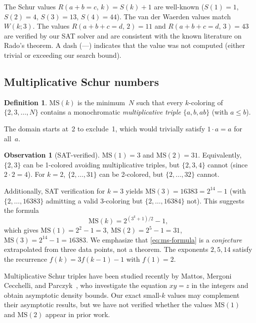 \documentclass[11pt]{article}
\theoremstyle{plain}
\theoremstyle{definition}
\newtheorem{definition}[theorem]{Definition}
\newtheorem{observation}[theorem]{Observation}
\newcommand{\MS}{\mathrm{MS}}
\begin{document}
\noindent
The Schur values $R(a{+}b{=}c,\, k) = S(k)+1$ are well-known
($S(1)=1$, $S(2)=4$, $S(3)=13$, $S(4)=44$).
The van der Waerden values match $W(k;3)$.
The values $R(a{+}b{+}c{=}d,\, 2)=11$ and
$R(a{+}b{+}c{=}d,\, 3)=43$ are verified by our SAT solver and are
consistent with the known literature on Rado's theorem.
A dash (---) indicates that the value was not computed (either
trivial or exceeding our search bound).

\subsection{Multiplicative Schur numbers}

\begin{definition}
$\MS(k)$ is the minimum~$N$ such that every $k$-coloring of
$\{2,3,\ldots,N\}$ contains a monochromatic \emph{multiplicative
triple} $\{a,b,ab\}$ (with $a\le b$).
\end{definition}

\noindent
The domain starts at~2 to exclude~1, which would trivially satisfy
$1\cdot a = a$ for all~$a$.

\begin{observation}[SAT-verified]\label{obs:ms}
$\MS(1) = 3$ and $\MS(2) = 31$.
Equivalently, $\{2,3\}$ can be 1-colored avoiding multiplicative
triples, but $\{2,3,4\}$ cannot (since $2\cdot 2=4$).
For $k=2$, $\{2,\ldots,31\}$ can be 2-colored, but
$\{2,\ldots,32\}$ cannot.
\end{observation}

\noindent
Additionally, SAT verification for $k=3$ yields
$\MS(3)=16383=2^{14}-1$ (with $\{2,\ldots,16383\}$ admitting a valid
3-coloring but $\{2,\ldots,16384\}$ not).
This suggests the formula
\begin{equation}\label{eq:ms-formula}
\MS(k) = 2^{(3^k+1)/2} - 1,
\end{equation}
which gives $\MS(1)=2^2-1=3$, $\MS(2)=2^5-1=31$, $\MS(3)=2^{14}-1=16383$.
We emphasize that \eqref{eq:ms-formula} is a \emph{conjecture}
extrapolated from three data points, not a theorem.
The exponents $2,5,14$ satisfy the recurrence $f(k)=3f(k-1)-1$ with
$f(1)=2$.

Multiplicative Schur triples have been studied recently by
Mattos, Mergoni Cecchelli, and Parczyk~\cite{mattos2024}, who
investigate the equation $xy=z$ in the integers and obtain asymptotic
density bounds.
Our exact small-$k$ values may complement their asymptotic results,
but we have not verified whether the values $\MS(1)$ and $\MS(2)$
appear in prior work.
\end{document}
